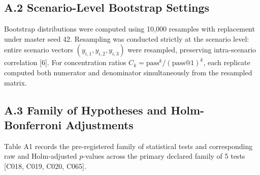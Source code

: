 \documentclass[11pt,letterpaper]{article}
\begin{document}
\subsection*{A.2 Scenario-Level Bootstrap Settings}
Bootstrap distributions were computed using 10,000 resamples with replacement under master seed 42. Resampling was conducted strictly at the scenario level: entire scenario vectors $(y_{i,1}, y_{i,2}, y_{i,3})$ were resampled, preserving intra-scenario correlation [6]. For concentration ratios $C_k = \text{pass}^k / (\text{pass@1})^k$, each replicate computed both numerator and denominator simultaneously from the resampled matrix.

\subsection*{A.3 Family of Hypotheses and Holm-Bonferroni Adjustments}
Table A1 records the pre-registered family of statistical tests and corresponding raw and Holm-adjusted $p$-values across the primary declared family of 5 tests [C018, C019, C020, C065].


\begin{table}[htbp]
\centering
\small
\setlength{\tabcolsep}{4.5pt}
\caption{Table A1: Evaluated family of statistical tests and sequentially rejective Holm-Bonferroni adjustments. [C018, C019, C020, C065]}
\end{table}
\end{document}
